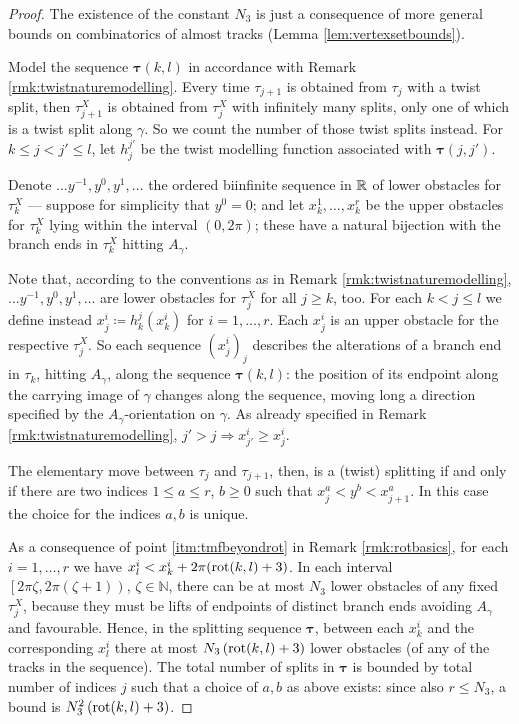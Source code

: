 \begin{proof}
The existence of the constant $N_3$ is just a consequence of more general bounds on combinatorics of almost tracks (Lemma \ref{lem:vertexsetbounds}).

Model the sequence $\bm\tau(k,l)$ in accordance with Remark \ref{rmk:twistnaturemodelling}. Every time $\tau_{j+1}$ is obtained from $\tau_j$ with a twist split, then $\tau_{j+1}^X$ is obtained from $\tau_j^X$ with infinitely many splits, only one of which is a twist split along $\gamma$. So we count the number of those twist splits instead. For $k\leq j<j'\leq l$, let $h_j^{j'}$ be the twist modelling function associated with $\bm\tau(j,j')$.

Denote $\ldots y^{-1}, y^0, y^1,\ldots$ the ordered biinfinite sequence in $\mathbb R$ of lower obstacles for $\tau_k^X$ --- suppose for simplicity that $y^0=0$; and let $x_k^1,\ldots,x_k^r$ be the upper obstacles for $\tau_k^X$ lying within the interval $(0,2\pi)$; these have a natural bijection with the branch ends in $\tau_k^X$ hitting $A_\gamma$. 

Note that, according to the conventions as in Remark \ref{rmk:twistnaturemodelling}, $\ldots y^{-1}, y^0, y^1,\ldots$ are lower obstacles for $\tau_j^X$ for all $j\geq k$, too. For each $k<j\leq l$ we define instead $x_j^i\coloneqq h_k^j(x_k^i)$ for $i=1,\ldots,r$. Each $x_j^i$ is an upper obstacle for the respective $\tau_j^X$. So each sequence $(x_j^i)_j$ describes the alterations of a branch end in $\tau_k$, hitting $A_\gamma$, along the sequence $\bm\tau(k,l)$: the position of its endpoint along the carrying image of $\gamma$ changes along the sequence, moving long a direction specified by the $A_\gamma$-orientation on $\gamma$. As already specified in Remark \ref{rmk:twistnaturemodelling}, $j'>j\Rightarrow x_{j'}^i\geq x_j^i$.

The elementary move between $\tau_j$ and $\tau_{j+1}$, then, is a (twist) splitting if and only if there are two indices $1\leq a\leq r$, $b\geq 0$ such that $x_j^a<y^b<x_{j+1}^a$. In this case the choice for the indices $a, b$ is unique.

As a consequence of point \ref{itm:tmfbeyondrot} in Remark \ref{rmk:rotbasics}, for each $i=1,\ldots,r$ we have $x_l^i<x_k^i +2\pi(\mathrm{rot}(k,l)+3)$. In each interval $\left[2\pi \zeta,2\pi(\zeta+1)\right)$, $\zeta\in\mathbb N$, there can be at most $N_3$ lower obstacles of any fixed $\tau_j^X$, because they must be lifts of endpoints of distinct branch ends avoiding $A_\gamma$ and favourable. Hence, in the splitting sequence $\bm\tau$, between each $x_k^i$ and the corresponding $x_l^i$ there at most $N_3\left(\mathrm{rot}(k,l)+3\right)$ lower obstacles (of any of the tracks in the sequence). The total number of splits in $\bm\tau$ is bounded by total number of indices $j$ such that a choice of $a,b$ as above exists: since also $r\leq N_3$, a bound is $N_3^2\left(\mathrm{rot}(k,l)+3\right)$.
\end{proof}

